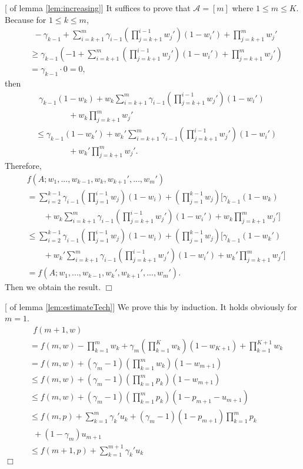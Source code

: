 \documentclass{article}
\newcommand{\cA}{\mathcal{A}}
\newenvironment{proof}{\noindent {\textbf{Proof. }}}{$\Box$ \medskip}
\begin{document}
\begin{proof}[ of lemma \ref{lem:increasing}]
It suffices to prove that $\cA = [m]$ where $1 \leq m \leq K$. Because for $1 \leq k \leq m$,
\begin{align*}
&~~-\gamma_{k-1} + \sum_{i=k+1}^m \gamma_{i-1}(\prod_{j=k+1}^{i-1}w_j')(1- w_i') + \prod_{j=k+1}^{m}w_j'\\
&\geq \gamma_{k-1} (-1 + \sum_{i=k+1}^m (\prod_{j=k+1}^{i-1}w_j')(1- w_i') +  \prod_{j=k+1}^{m}w_j')\\
&=\gamma_{k-1} \cdot 0 = 0,
\end{align*}
then
\begin{align*}
&~~\gamma_{k-1} (1 - w_k) + w_k\sum_{i=k+1}^m \gamma_{i-1}(\prod_{j=k+1}^{i-1}w_j')(1- w_i')\\
&\qquad \qquad + w_k\prod_{j=k+1}^{m}w_j'\\
& \leq \gamma_{k-1} (1 - w_k') + w_k'\sum_{i=k+1}^m \gamma_{i-1}(\prod_{j=k+1}^{i-1}w_j')(1- w_i')\\
&\qquad \qquad + w_k'\prod_{j=k+1}^{m}w_j'.
\end{align*}
Therefore, 
\begin{align*}
& f(A; w_1,...,w_{k-1},w_k,w_{k+1}',...,w_m')\\
&=\sum_{i=2}^{k-1} \gamma_{i-1} (\prod_{j=1}^{i-1}w_j)(1 - w_i) + (\prod_{j=1}^{k-1}w_j) [\gamma_{k-1} (1 - w_k) \\
&\qquad + w_k\sum_{i=k+1}^m \gamma_{i-1}(\prod_{j=k+1}^{i-1}w_j')(1- w_i') + w_k\prod_{j=k+1}^{m}w_j']\\
&\leq \sum_{i=2}^{k-1} \gamma_{i-1} (\prod_{j=1}^{i-1}w_j) (1 - w_i) + (\prod_{j=1}^{k-1}w_j) [\gamma_{k-1} (1 - w_k') \\
&\qquad + w_k'\sum_{i=k+1}^m \gamma_{i-1} (\prod_{j=k+1}^{i-1}w_j')(1- w_i') + w_k'\prod_{j=k+1}^{m}w_j']\\
&=f(A; w_1,...,w_{k-1},w_{k}',w_{k+1}',...,w_m').
\end{align*}
Then we obtain the result.
\end{proof}

\begin{proof}[ of lemma \ref{lem:estimateTech}]
We prove this by induction. It holds obviously for $m=1$.
\begin{align*}
&~~f(m+1, w)\\
&= f(m, w) -\prod_{k=1}^{m} w_k + \gamma_{m}  (\prod_{k=1}^{K} w_k) (1 - w_{K+1})+ \prod_{k=1}^{K+1} w_k\\
&= f(m, w) + (\gamma_{m} - 1) (\prod_{k=1}^{m} w_k) (1 - w_{m+1})\\
&\leq f(m, w) + (\gamma_{m} - 1) (\prod_{k=1}^{m} p_k) (1 - w_{m+1})\\
&\leq f(m, w) + (\gamma_{m} - 1) (\prod_{k=1}^{m} p_k)  (1 - p_{m+1} - u_{m+1})\\
&\leq f(m, p) +  \sum_{k=1}^{m} \gamma_k' u_k + (\gamma_{m} - 1) (1 - p_{m+1}) \prod_{k=1}^{m} p_k\\
&~~ + (1 - \gamma_{m}) u_{m+1}\\
&\leq f(m+1, p) + \sum_{k=1}^{m+1} \gamma_k' u_k
\end{align*}
\end{proof}
\end{document}
